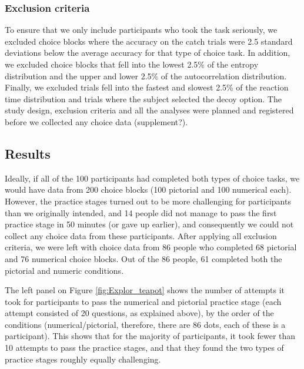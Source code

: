 \documentclass[11pt,a4paper]{article}
\begin{document}
\subsubsection{Exclusion criteria}

To ensure that we only include participants who took the task seriously, we excluded choice blocks where the accuracy on the catch trials were 2.5 standard deviations below the average accuracy for that type of choice task. In addition, we excluded choice blocks that fell into the lowest 2.5\% of the entropy distribution
and the upper and lower 2.5\% of the autocorrelation distribution. Finally, we excluded trials fell into the fastest and slowest 2.5\% of
the reaction time distribution and trials where the subject selected the decoy option.
The study design, exclusion criteria and all the analyses were planned and
registered before we collected any choice data (supplement?).

\subsection{Results}

Ideally, if all of the 100 participants had completed both types of choice tasks, we would have data from 200 choice blocks (100 pictorial and 100 numerical each). However, the practice stages turned out to be more challenging for participants than we originally intended, and 14 people did not manage to pass the first practice stage in 50 minutes (or gave up earlier), and consequently we could not collect any choice data from these participants. After applying all exclusion criteria, we were left with choice data from 86 people who completed 68 pictorial and 76 numerical choice blocks. Out of the 86 people, 61 completed both the pictorial and numeric conditions.

The left panel on Figure \ref{fig:Explor_teapot} shows the number of attempts it took for participants to pass the numerical and pictorial practice stage (each attempt consisted of 20 questions, as explained above), by the order of the conditions (numerical/pictorial, therefore, there are 86 dots, each of these is a participant). This shows that for the majority of participants, it took fewer than 10 attempts to pass the practice stages, and that they found the two types of practice stages roughly equally challenging. 
\end{document}
